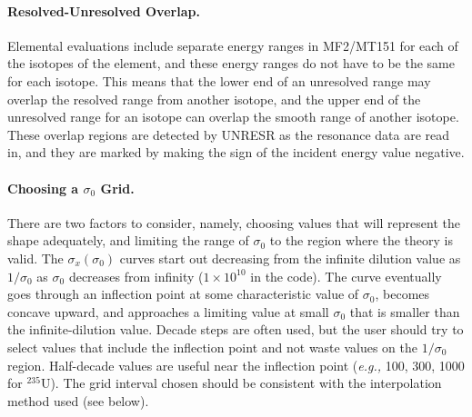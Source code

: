 \paragraph{Resolved-Unresolved Overlap.}
Elemental evaluations include separate energy ranges in MF2/MT151
for each of the isotopes of the element, and these energy ranges
do not have to be the same for each isotope.  This means that the
lower end of an unresolved range may overlap the resolved
range from another isotope, and the upper end of the unresolved
range for an isotope can overlap the smooth range of another isotope.
These overlap regions are detected by UNRESR as the resonance data
are read in, and they are marked by making the sign of the incident
energy value negative.


\paragraph{Choosing a $\sigma_0$ Grid.}
There are two factors to consider, namely, choosing values that
will represent the shape adequately, and limiting the range of
$\sigma_0$ to the region where the theory is valid.  The
$\sigma_x(\sigma_0)$ curves start out decreasing from the
infinite dilution value as $1/\sigma_0$ as $\sigma_0$ decreases
from infinity ($1\times 10^{10}$ in the code).  The curve eventually
goes through an inflection point at some characteristic value
of $\sigma_0$, becomes concave upward, and approaches a limiting
value at small $\sigma_0$ that is smaller than the
infinite-dilution value.  Decade steps are often used, but the
user should try to select values that include the inflection point
and not waste values on the $1/\sigma_0$ region.  Half-decade
values are useful near the inflection point ({\it e.g.,} 100,
300, 1000 for $^{235}$U).  The grid interval chosen should be
consistent with the interpolation method used (see below).

